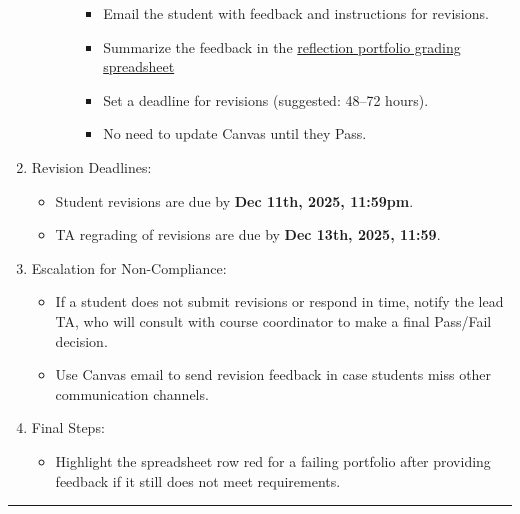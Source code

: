 \documentclass[
]{article}
\providecommand{\tightlist}{%
  \setlength{\itemsep}{0pt}\setlength{\parskip}{0pt}}
\begin{document}
\begin{enumerate}
\begin{itemize}
\begin{itemize}
      \begin{itemize}
      \tightlist
      \item
        Email the student with feedback and instructions for revisions.\\
      \item
        Summarize the feedback in the \href{https://docs.google.com/spreadsheets/d/1tOP3nKaxPEMGZprCt2eqzTt-4ICCyVoQgQQBqT2EKrE/edit?gid=1778739291\#gid=1778739291}{reflection portfolio grading spreadsheet}\\
      \item
        Set a deadline for revisions (suggested: 48--72 hours).\\
      \item
        No need to update Canvas until they Pass.
      \end{itemize}
    \end{itemize}
  \end{itemize}
\item
  Revision Deadlines:

  \begin{itemize}
  \tightlist
  \item
    Student revisions are due by \textbf{Dec 11th, 2025, 11:59pm}.
  \item
    TA regrading of revisions are due by \textbf{Dec 13th, 2025, 11:59}.
  \end{itemize}
\item
  Escalation for Non-Compliance:

  \begin{itemize}
  \tightlist
  \item
    If a student does not submit revisions or respond in time, notify the lead TA, who will consult with course coordinator to make a final Pass/Fail decision.\\
  \item
    Use Canvas email to send revision feedback in case students miss other communication channels.
  \end{itemize}
\item
  Final Steps:

  \begin{itemize}
  \tightlist
  \item
    Highlight the spreadsheet row red for a failing portfolio after providing feedback if it still does not meet requirements.
  \end{itemize}
\end{enumerate}

\begin{center}\rule{0.5\linewidth}{0.5pt}\end{center}
\end{document}
